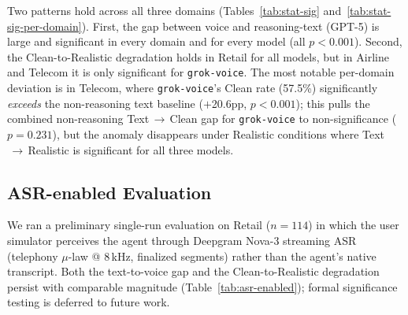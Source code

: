Two patterns hold across all three domains (Tables~\ref{tab:stat-sig} and~\ref{tab:stat-sig-per-domain}). First, the gap between voice and reasoning-text (GPT-5) is large and significant in every domain and for every model (all $p < 0.001$). Second, the Clean-to-Realistic degradation holds in Retail for all models, but in Airline and Telecom it is only significant for \texttt{grok-voice}. The most notable per-domain deviation is in Telecom, where \texttt{grok-voice}'s Clean rate (57.5\%) significantly \emph{exceeds} the non-reasoning text baseline ($+$20.6pp, $p < 0.001$); this pulls the combined non-reasoning Text$\,\to\,$Clean gap for \texttt{grok-voice} to non-significance ($p = 0.231$), but the anomaly disappears under Realistic conditions where Text$\,\to\,$Realistic is significant for all three models.%

%

\begin{table}[h]
\caption{Pairwise statistical significance pooled across all three domains (Airline, Retail, Telecom; 2 runs each). Text (NR) = GPT-4.1; Text (R) = GPT-5. All $p$-values are Holm-Bonferroni corrected paired permutation tests (100k permutations, paired by task ID).}
\label{tab:stat-sig}
\centering
\begin{small}

\end{small}
\end{table}

\begin{table}[h]
\caption{Per-domain pairwise statistical significance (2 runs per condition). Text (NR) = GPT-4.1; Text (R) = GPT-5. All $p$-values are Holm-Bonferroni corrected paired permutation tests (100k permutations, paired by task ID, corrected within each (domain, model) group).}
\label{tab:stat-sig-per-domain}
\centering
\begin{small}

\end{small}
\end{table}

\subsection{ASR-enabled Evaluation}\label{app:asr-enabled}

We ran a preliminary single-run evaluation on Retail ($n=114$) in which the user simulator perceives the agent through Deepgram Nova-3 streaming ASR (telephony $\mu$-law @ 8\,kHz, finalized segments) rather than the agent's native transcript. Both the text-to-voice gap and the Clean-to-Realistic degradation persist with comparable magnitude (Table~\ref{tab:asr-enabled}); formal significance testing is deferred to future work.%

